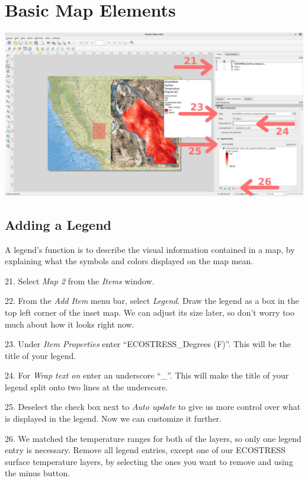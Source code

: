 \documentclass[oneside,a4paper,11pt,explicit]{book}
\begin{document}
\section{Basic Map Elements}

\centerline{\includegraphics[width=\textwidth]{TempLegend1.png}}

\subsection{Adding a Legend}

A legend's function is to describe the visual information contained in a map, by explaining what the symbols and colors displayed on the map mean.

21. Select \textit{Map 2} from the \textit{Items} window.

22. From the \textit{Add Item} menu bar, select \textit{Legend}. Draw the legend as a box in the top left corner of the inset map. We can adjust its size later, so don't worry too much about how it looks right now.

23. Under \textit{Item Properties} enter ``ECOSTRESS\_Degrees (F)''. This will be the title of your legend. 

24. For \textit{Wrap text on} enter an underscore ``\_''. This will make the title of your legend split onto two lines at the underscore. 

25. Deselect the check box next to \textit{Auto update} to give us more control over what is displayed in the legend. Now we can customize it further.

26. We matched the temperature ranges for both of the layers, so only one legend entry is necessary. Remove all legend entries, except one of our ECOSTRESS surface temperature layers, by selecting the ones you want to remove and using the minus button. 
\end{document}
